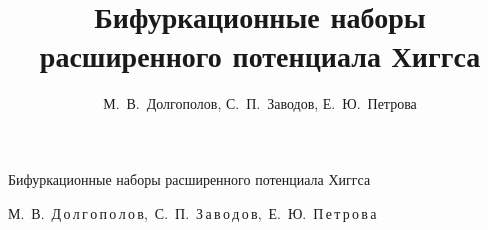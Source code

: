 %

%

%

%

%

%




\renewcommand{\firstpage}{173}

\renewcommand{\lastpage}{183}












%











\renewcommand{\baselinestretch}{0.86}








%




\title{Бифуркационные наборы расширенного потенциала Хиггса}{Бифуркационные наборы расширенного потенциала Хиггса}



\author{М.~В.~Долгополов, С.~П.~Заводов, Е.~Ю.~Петрова}

{М.~В.~Д\,о\,л\,г\,о\,п\,о\,л\,о\,в,\ С.~П.~З\,а\,в\,о\,д\,о\,в,\ Е.~Ю.~П\,е\,т\,р\,о\,в\,а}








